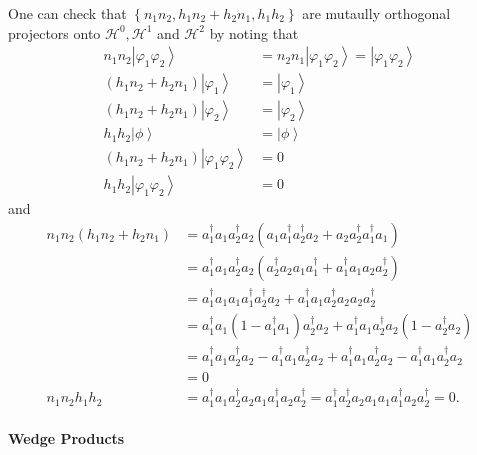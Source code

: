 \documentclass[aps,preprint]{revtex4}%
\begin{document}
One can check that $\left\{  n_{1}n_{2},h_{1}n_{2}+h_{2}n_{1},h_{1}%
h_{2}\right\}  $ are mutaully orthogonal projectors onto $\mathcal{H}%
^{0},\mathcal{H}^{1}$ and $\mathcal{H}^{2}$ by noting that
\begin{align*}
n_{1}n_{2}\left\vert \varphi_{1}\varphi_{2}\right\rangle  &  =n_{2}%
n_{1}\left\vert \varphi_{1}\varphi_{2}\right\rangle =\left\vert \varphi
_{1}\varphi_{2}\right\rangle \\
\left(  h_{1}n_{2}+h_{2}n_{1}\right)  \left\vert \varphi_{1}\right\rangle  &
=\left\vert \varphi_{1}\right\rangle \\
\left(  h_{1}n_{2}+h_{2}n_{1}\right)  \left\vert \varphi_{2}\right\rangle  &
=\left\vert \varphi_{2}\right\rangle \\
h_{1}h_{2}\left\vert \phi\right\rangle  &  =\left\vert \phi\right\rangle \\
\left(  h_{1}n_{2}+h_{2}n_{1}\right)  \left\vert \varphi_{1}\varphi
_{2}\right\rangle  &  =0\\
h_{1}h_{2}\left\vert \varphi_{1}\varphi_{2}\right\rangle  &  =0
\end{align*}
and%
\begin{align}
n_{1}n_{2}\left(  h_{1}n_{2}+h_{2}n_{1}\right)   &  =a_{1}^{\dagger}a_{1}%
a_{2}^{\dagger}a_{2}\left(  a_{1}a_{1}^{\dagger}a_{2}^{\dagger}a_{2}%
+a_{2}a_{2}^{\dagger}a_{1}^{\dagger}a_{1}\right) \\
&  =a_{1}^{\dagger}a_{1}a_{2}^{\dagger}a_{2}\left(  a_{2}^{\dagger}a_{2}%
a_{1}a_{1}^{\dagger}+a_{1}^{\dagger}a_{1}a_{2}a_{2}^{\dagger}\right) \\
&  =a_{1}^{\dagger}a_{1}a_{1}a_{1}^{\dagger}a_{2}^{\dagger}a_{2}%
+a_{1}^{\dagger}a_{1}a_{2}^{\dagger}a_{2}a_{2}a_{2}^{\dagger}\\
&  =a_{1}^{\dagger}a_{1}\left(  1-a_{1}^{\dagger}a_{1}\right)  a_{2}^{\dagger
}a_{2}+a_{1}^{\dagger}a_{1}a_{2}^{\dagger}a_{2}\left(  1-a_{2}^{\dagger}%
a_{2}\right) \\
&  =a_{1}^{\dagger}a_{1}a_{2}^{\dagger}a_{2}-a_{1}^{\dagger}a_{1}%
a_{2}^{\dagger}a_{2}+a_{1}^{\dagger}a_{1}a_{2}^{\dagger}a_{2}-a_{1}^{\dagger
}a_{1}a_{2}^{\dagger}a_{2}\\
&  =0\\
n_{1}n_{2}h_{1}h_{2}  &  =a_{1}^{\dagger}a_{1}a_{2}^{\dagger}a_{2}a_{1}%
a_{1}^{\dagger}a_{2}a_{2}^{\dagger}=a_{1}^{\dagger}a_{2}^{\dagger}a_{2}%
a_{1}a_{1}a_{1}^{\dagger}a_{2}a_{2}^{\dagger}=0.
\end{align}


\paragraph{Wedge Products}
\end{document}
